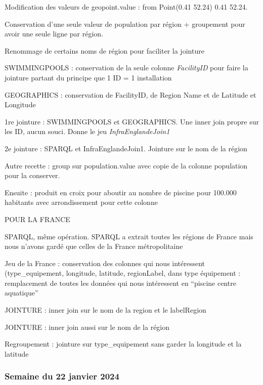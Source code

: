 \documentclass[hidelinks, 12pt]{article}
\begin{document}
Modification des valeurs de geopoint.value : from Point(0.41 52.24) 0.41 52.24.

Conservation d'une seule valeur de population par région + groupement pour avoir une seule ligne par région.

Renommage de certains noms de région pour faciliter la jointure


SWIMMINGPOOLS : conservation de la seule colonne \emph{FacilityID} pour faire la jointure partant du principe que 1 ID = 1 installation

GEOGRAPHICS : conservation de FacilityID, de Region Name et de Latitude et Longitude

1re jointure : SWIMMINGPOOLS et GEOGRAPHICS. Une inner join propre sur les ID, aucun souci. Donne le jeu \emph{InfraEnglandeJoin1}

2e jointure : SPARQL et InfraEnglandeJoin1. Jointure sur le nom de la région

Autre recette : group sur population.value avec copie de la colonne population pour la conserver.

Ensuite : produit en croix pour aboutir au nombre de piscine pour 100.000 habitants avec arrondissement pour cette colonne





POUR LA FRANCE

SPARQL, même opération. SPARQL a extrait toutes les régions de France mais nous n'avons gardé que celles de la France métropolitaine 

Jeu de la France : conservation des colonnes qui nous intéressent (type\_equipement, longitude, latitude, regionLabel, dans type équipement : remplacement de toutes les données qui nous intéressent en \enquote{piscine centre aquatique}

JOINTURE : inner join sur le nom de la region et le labelRegion 

JOINTURE : inner join aussi sur le nom de la région


Regroupement : jointure sur type\_equipement sans garder la longitude et la latitude 











\subsubsection{Semaine du 22 janvier 2024}
\end{document}
